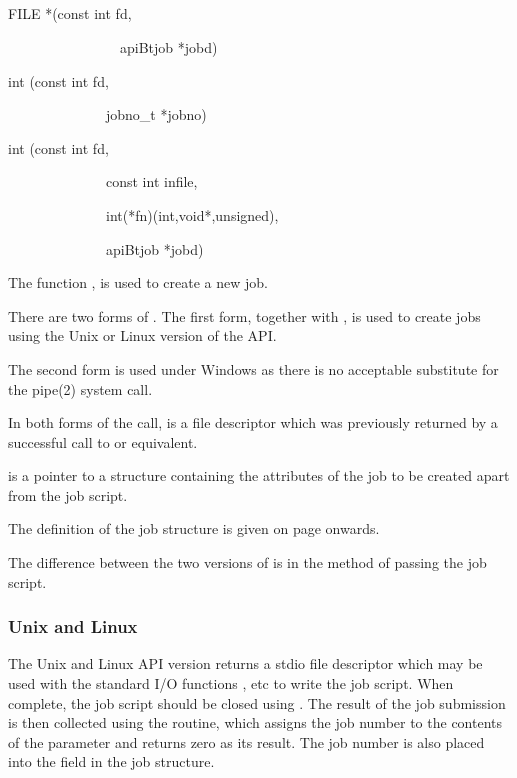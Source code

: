 \subsection{\funcnameXBjobadd{}}

\begin{expara}

FILE *\funcnameXBjobadd{}(const int fd,

\ \ \ \ \ \ \ \ \ \ \ \ \ \ \ \ apiBtjob *jobd)

\bigskip


int \funcnameXBjobres{}(const int fd,

\ \ \ \ \ \ \ \ \ \ \ \ \ \ jobno\_t *jobno)

\bigskip


int \funcnameXBjobadd{}(const int fd,

\ \ \ \ \ \ \ \ \ \ \ \ \ \ const int infile,

\ \ \ \ \ \ \ \ \ \ \ \ \ \ int(*fn)(int,void*,unsigned),

\ \ \ \ \ \ \ \ \ \ \ \ \ \ apiBtjob *jobd)

\end{expara}

The function \funcXBjobadd{}, is used to create a new \ProductName{} job.

There are two forms of \funcXBjobadd{}. The first form, together with \funcXBjobres{}, is used to
create jobs using the Unix or Linux version of the API.

The second form is used under Windows as there is no acceptable substitute for the pipe(2) system call.

In both forms of the call,  is a file descriptor which was previously returned by a successful call to
\funcXBopen{} or equivalent.

 is a pointer to a structure containing the attributes of the job to be created apart from the job script.

The definition of the job structure is given on page \pageref{bkm:Jobstructure} onwards.

The difference between the two versions of \funcXBjobadd{} is in the method of passing the job script.

\subsubsection{Unix and Linux}
The Unix and Linux API version returns a stdio file descriptor which may be used with the standard I/O functions
,  etc
to write the job script. When complete, the job script should be closed using . The result of the job
submission is then collected using the \funcXBjobres{} routine, which assigns the job number to the contents of the  parameter and
returns zero as its result. The job number is also placed into the  field in the job structure.

